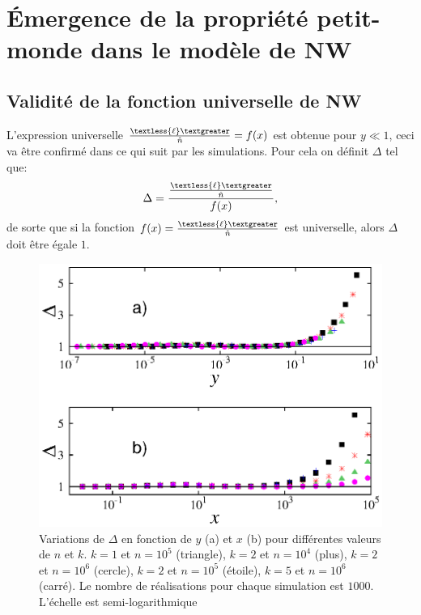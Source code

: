 \section{Émergence de la propriété petit-monde dans le modèle de NW}
\subsection{Validité de la fonction universelle de NW}
L'expression universelle $\frac{\textless {\ell} \textgreater}{\hat{n}}={f}(x)$ est obtenue pour $y\ll 1$, ceci va être confirmé dans ce qui suit par les simulations. Pour cela on définit $\Delta$ tel que:
\begin{equation}
\Delta= \frac{\frac{\textless {\ell} \textgreater}{\hat{n}}}{f(x)},
\end{equation}
de sorte que si la fonction $f(x)=\frac{\textless {\ell} \textgreater}{\hat{n}}$ est universelle, alors  $\Delta$ doit être égale $1$.
\begin{figure}[h!]
	\centering
	\includegraphics[scale=0.95,angle=0]{./figures/def}
	\caption{Variations de $\Delta$ en fonction de $y$ (a)  et $x$ (b) pour différentes valeurs de $n$ et $k$. $k=1$ et $n=10^{5}$ (triangle),	$k=2$ et $n=10^{4}$ (plus),  $k=2$ et $n=10^{6}$ (cercle), $k=2$ et $n=10^{5}$ (étoile), $k=5$ et $n=10^{6}$ (carré). Le nombre de réalisations pour chaque simulation est $1000$. L'échelle est semi-logarithmique}
	\label{def}
\end{figure}\\
